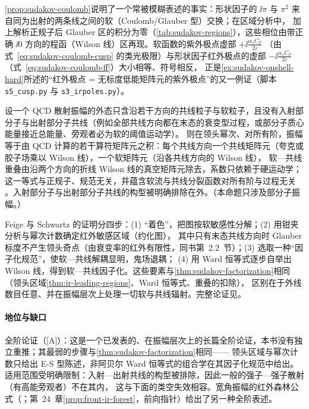 \cref{prop:sudakov-coulomb}说明了一个常被模糊表述的事实：形状因子的 $\ii\pi$ 与 $\pi^2$ 来自同为出射的两条线之间的软（Coulomb/Glauber 型）交换；在区域分析中，
加上解析正规子后 Glauber 区的积分为零（\cref{tab:sudakov-regions}），这些相位由带正确 $\ii0$ 方向的程函（Wilson 线）区再现。软函数的紫外极点虚部 $+\ii\frac{\alpha_sC_F}{2\varepsilon}$
（由式~\eqref{eq:sudakov-coulomb-cusp} 的类光极限）与形状因子红外极点的虚部 $-\ii\frac{\alpha_sC_F}{2\varepsilon}$（式~\eqref{eq:sudakov-coulomb-ff}）大小相等、符号相反，
正是\cref{ex:sudakov-onshell-hard}所述的“红外极点 = 无标度低能矩阵元的紫外极点”的又一例证（脚本 \texttt{s5\_cusp.py} 与 \texttt{s3\_irpoles.py}）。

\begin{proposition}\label{prop:sudakov-amplitude-factorization}
设一个 QCD 散射振幅的外态只含沿若干方向的共线粒子与软粒子，且没有入射部分子与出射部分子共线（例如全部共线方向都在末态的衰变型过程，或部分子质心能量接近总能量、旁观者必为软的阈值运动学）。
则在领头幂次、对所有阶，振幅等于由 QCD 计算的若干算符矩阵元之积：每个共线方向一个共线矩阵元（夸克或胶子场乘以 Wilson 线），一个软矩阵元（沿各共线方向的 Wilson 线），
软—共线重叠由沿两个方向的折线 Wilson 线的真空矩阵元除去，系数只依赖于硬运动学；这一等式与正规子、规范无关，并蕴含软流与共线分裂函数对所有阶与过程无关
\cite{FeigeSchwartz2014,Feige:2013zla}。入射部分子与出射部分子共线的构型被明确排除在外\cite[第~2.2、10、11.2~节]{FeigeSchwartz2014}。（本命题只涉及部分子振幅。）
\end{proposition}

\begin{proofsketch}
Feige 与 Schwartz 的证明分四步\cite[第~5--9~节]{FeigeSchwartz2014}：(1) “着色”，把图按软敏感性分解；(2) 用钳夹分析与幂次计数确定红外敏感区域（约化图），
其中只有末态共线方向时 Glauber 标度不产生领头奇点（由衰变率的红外有限性，同书第~2.2~节）；(3) 选取一种“因子化规范”，使软—共线解耦显明，鬼场退耦；
(4) 用 Ward 恒等式逐步自举出 Wilson 线，得到软—共线因子化。这些要素与\cref{thm:sudakov-factorization}相同（领头区域\cref{thm:ir-leading-regions}、Ward 恒等式、重叠的扣除），
区别在于外线数目任意、并在振幅层次上处理一切软与共线辐射。完整论证见\cite{FeigeSchwartz2014}。
\end{proofsketch}

\paragraph{地位与缺口}全阶论证（[A]）：这是一个已发表的、在振幅层次上的长篇全阶论证，本书没有独立重推；其最弱的步骤与\cref{thm:sudakov-factorization}相同——
领头区域与幂次计数只给出 E-S 型陈述，非阿贝尔 Ward 恒等式的组合学在其因子化规范中给出。适用范围受明确限制：入射—出射共线的构型被排除，因此一般的强子—强子散射（有高能旁观者）不在其内，
这与下面的类空失效相容。宽角振幅的红外森林公式（\cite{Ma2020}；第~24~章\cref{prop:front-ir-forest}，前向指针）给出了另一种全阶表述。

